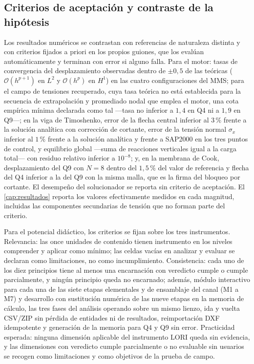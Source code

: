 \subsection{Criterios de aceptación y contraste de la hipótesis}
\label{sec:validacion-resultados}

Los resultados numéricos se contrastan con referencias de naturaleza distinta y con criterios fijados a priori en los propios guiones, que los evalúan automáticamente y terminan con error si alguno falla. Para el motor: tasas de convergencia del desplazamiento observadas dentro de $\pm0{,}5$ de las teóricas ($\mathcal{O}(h^{p+1})$ en $L^2$ y $\mathcal{O}(h^{p})$ en $H^1$) en las cuatro configuraciones del MMS; para el campo de tensiones recuperado, cuya tasa teórica no está establecida para la secuencia de extrapolación y promediado nodal que emplea el motor, una cota empírica mínima declarada como tal —tasa no inferior a $1{,}4$ en Q4 ni a $1{,}9$ en Q9—; en la viga de Timoshenko, error de la flecha central inferior al $3\,\%$ frente a la solución analítica con corrección de cortante, error de la tensión normal $\sigma_x$ inferior al $1\,\%$ frente a la solución analítica y frente a SAP2000 en los tres puntos de control, y equilibrio global —suma de reacciones verticales igual a la carga total— con residuo relativo inferior a $10^{-8}$; y, en la membrana de Cook, desplazamiento del Q9 con $N=8$ dentro del $1{,}5\,\%$ del valor de referencia y flecha del Q4 inferior a la del Q9 con la misma malla, que es la firma del bloqueo por cortante. El desempeño del solucionador se reporta sin criterio de aceptación. El \autoref{cap:resultados} reporta los valores efectivamente medidos en cada magnitud, incluidas las componentes secundarias de tensión que no forman parte del criterio.

Para el potencial didáctico, los criterios se fijan sobre los tres instrumentos. Relevancia: las once unidades de contenido tienen instrumento en los niveles comprender y aplicar como mínimo; las celdas vacías en analizar y evaluar se declaran como limitaciones, no como incumplimiento. Consistencia: cada uno de los diez principios tiene al menos una encarnación con veredicto cumple o cumple parcialmente, y ningún principio queda no encarnado; además, módulo interactivo para cada una de las siete etapas elementales y de ensamblaje del canal (M1 a M7) y desarrollo con sustitución numérica de las nueve etapas en la memoria de cálculo, las tres fases del análisis operando sobre un mismo lienzo, ida y vuelta CSV/ZIP sin pérdida de entidades ni de resultados, reimportación DXF idempotente y generación de la memoria para Q4 y Q9 sin error. Practicidad esperada: ninguna dimensión aplicable del instrumento LORI queda sin evidencia, y las dimensiones con veredicto cumple parcialmente o no evaluable sin usuarios se recogen como limitaciones y como objetivos de la prueba de campo.

